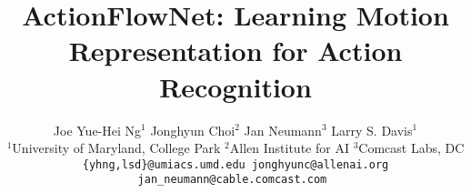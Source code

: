 \documentclass[10pt,twocolumn,letterpaper]{article}
\begin{document}
\title{ActionFlowNet: Learning Motion Representation for Action Recognition}
\author{
  Joe Yue-Hei Ng$^1$ \hspace{1em}
  Jonghyun Choi$^2$ \hspace{1em}
  Jan Neumann$^3$ \hspace{1em}
  Larry S. Davis$^1$ \vspace{.3em}
  \\
  $^1$University of Maryland, College Park \hspace{1.5em}
  $^2$Allen Institute for AI \hspace{1.5em}
  $^3$Comcast Labs, DC \vspace{.3em}\\
{\tt\small \{yhng,lsd\}@umiacs.umd.edu \hspace{1em}
jonghyunc@allenai.org \hspace{1em}
jan\_neumann@cable.comcast.com }
}

\maketitle
\ifwacvfinal\thispagestyle{empty}\fi
\end{document}
